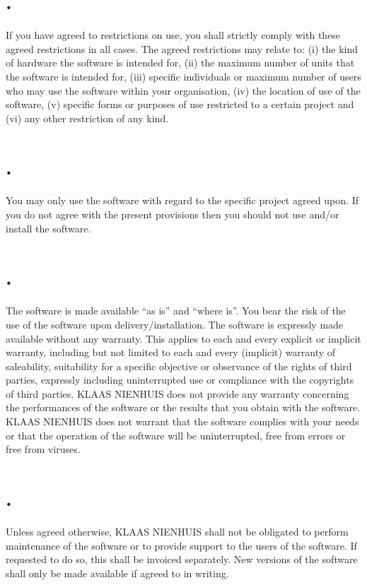 \documentclass[letterpaper,10pt,english]{sphinxmanual}
\begin{document}
\section{.}
\label{Development:id6}
If you have agreed to restrictions on use, you shall strictly comply with these agreed restrictions in all cases. The agreed restrictions may relate to: (i) the kind of hardware the software is intended for, (ii) the maximum number of units that the software is intended for, (iii) specific individuals or maximum number of users who may use the software within your organisation, (iv) the location of use of the software, (v) specific forms or purposes of use restricted to a certain project and (vi) any other restriction of any kind.


\section{.}
\label{Development:id7}
You may only use the software with regard to the specific project agreed upon. If you do not agree with the present provisions then you should not use and/or install the software.


\section{.}
\label{Development:id8}
The software is made available “as is” and “where is”. You bear the risk of the use of the software upon delivery/installation. The software is expressly made available without any warranty. This applies to each and every explicit or implicit warranty, including but not limited to each and every (implicit) warranty of saleability, suitability for a specific objective or observance of the rights of third parties, expressly including uninterrupted use or compliance with the copyrights of third parties. KLAAS NIENHUIS does not provide any warranty concerning the performances of the software or the results that you obtain with the software. KLAAS NIENHUIS does not warrant that the software complies with your needs or that the operation of the software will be uninterrupted, free from errors or free from viruses.


\section{.}
\label{Development:id9}
Unless agreed otherwise, KLAAS NIENHUIS shall not be obligated to perform maintenance of the software or to provide support to the users of the software. If requested to do so, this shall be invoiced separately. New versions of the software shall only be made available if agreed to in writing.
\end{document}
